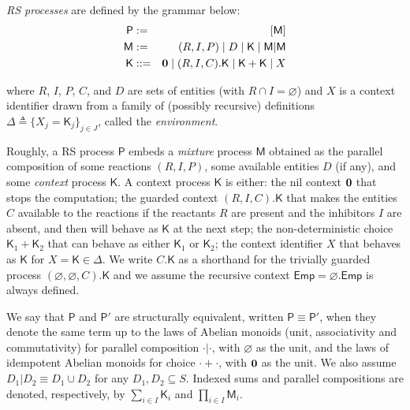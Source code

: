 \begin{definition}[RS processes]\label{def:LTSforRS}
\emph{RS processes} are defined by the grammar below:
\begin{eqnarray*}
\mathsf{P} & := & [\mathsf{M}]
\\
\mathsf{M} & := & (R,I,P) \mid D \mid \mathsf{K} \mid \mathsf{M}|\mathsf{M}
\\
\mathsf{K} & ::= & \mathbf{0} \mid (R,I,C).\mathsf{K} \mid \mathsf{K}+\mathsf{K} \mid X
\end{eqnarray*}

\noindent
where $R$, $I$, $P$, $C$, and $D$ are sets of entities (with $R\cap I=\varnothing$) and $X$ is a context identifier drawn from a family of (possibly recursive) definitions $\Delta \triangleq\{X_j=\mathsf{K}_j\}_{j\in J}$, called the \emph{environment}.
\end{definition}

Roughly, a RS process  $\mathsf{P}$ embeds a \emph{mixture} process $\mathsf{M}$ obtained as the parallel composition of some reactions $(R,I,P)$, some available entities $D$ (if any), and some \emph{context} process $\mathsf{K}$.
A  context process $\mathsf{K}$ is either: 
the nil context $\mathbf{0}$ that stops the computation;
the guarded context $(R,I,C).\mathsf{K}$ that makes the entities $C$ available to the reactions if the reactants $R$ are present and the inhibitors $I$ are absent, and then will behave as $\mathsf{K}$ at the next step;
the non-deterministic choice $\mathsf{K}_1+\mathsf{K}_2$ that can behave as either  $\mathsf{K}_1$ or $\mathsf{K}_2$;  
the context identifier $X$ that behaves as $\mathsf{K}$ for $X=\mathsf{K}\in \Delta$.
We write $C.\mathsf{K}$ as a shorthand for the trivially guarded process $(\varnothing,\varnothing,C).\mathsf{K}$ and we assume the recursive context $\mathsf{Emp}=\varnothing.\mathsf{Emp}$ is always defined.


We say that $\mathsf{P}$ and $\mathsf{P}'$ are structurally equivalent, written $\mathsf{P} \equiv \mathsf{P}'$, when they denote the same term up to the laws of Abelian monoids (unit, associativity and commutativity) for  parallel composition $\cdot | \cdot$, with $\varnothing$ as the unit, and the laws of idempotent Abelian monoids for choice $\cdot +\cdot$, with $\mathbf{0}$ as the unit. We also assume $D_1 | D_2 \equiv D_1\cup D_2$ for any $D_1,D_2\subseteq S$.
Indexed sums and parallel compositions are denoted, respectively, by $\sum_{i\in I} \mathsf{K}_i$ and $\prod_{i\in I} \mathsf{M}_i$.

